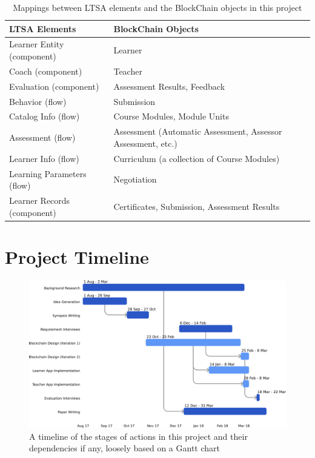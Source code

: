\begin{table}[!h] 
    \caption{Mappings between LTSA elements and the BlockChain objects in this project}
    \centering
    \label{table:ltsa-bcu}
    \begin{tabularx}{\textwidth}{l|X}
        \textbf{LTSA Elements} & \textbf{BlockChain Objects}
        \\\toprule
        Learner Entity (component) & Learner
        \\\midrule
        Coach (component) & Teacher
        \\\midrule
        Evaluation (component) & Assessment Results, Feedback
        \\\midrule
        Behavior (flow) & Submission
        \\\midrule
        Catalog Info (flow) & Course Modules, Module Units
        \\\midrule
        Assessment (flow) & Assessment (Automatic Assessment, Assessor Assessment, etc.)
        \\\midrule
        Learner Info (flow) & Curriculum (a collection of Course Modules)
        \\\midrule
        Learning Parameters (flow) & Negotiation
        \\\midrule
        Learner Records (component) & Certificates, Submission, Assessment Results
        \\\bottomrule
    \end{tabularx}
\end{table}

\section{Project Timeline}

\begin{figure}[!hb] 
    \centering    
    \includegraphics[width=1.0\textwidth]{simple_gantt}
    \caption[Project Timeline]
        {A timeline of the stages of actions in this project and their dependencies if any, loosely based on a Gantt chart} 
    \label{fig:simple_gantt}
\end{figure}

